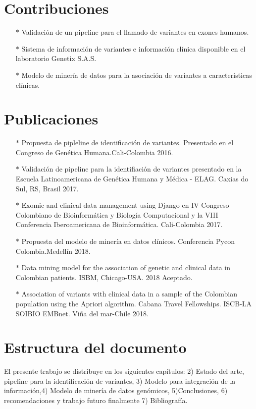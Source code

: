 \section*{Contribuciones}

\begin{itemize}
	\item[$*$] Validación de un pipeline para el llamado de variantes en exones humanos. 
	\item[$*$] Sistema de información de variantes e información clínica  disponible en el laboratorio Genetix S.A.S.
	\item[$*$] Modelo de minería de datos para la asociación de variantes a caracteristicas clínicas. 

\end{itemize}

\section*{Publicaciones}
\begin{itemize}
	\item[$*$] Propuesta de pipleline de identificación de variantes. Presentado en el Congreso de Genética Humana.Cali-Colombia 2016.
	\item[$*$] Validación de pipeline para la identifiación de variantes presentado en la Escuela Latinoamericana de Genética Humana y Médica - ELAG. Caxias do Sul, RS, Brasil 2017.
	\item[$*$] Exomic and clinical data management using Django en IV Congreso Colombiano de Bioinformática y Biología Computacional y la VIII Conferencia Iberoamericana de Bioinformática. Cali-Colombia 2017.
	\item[$*$] Propuesta del  modelo de minería en datos clínicos. Conferencia Pycon Colombia.Medellín 2018.
	\item[$*$] Data mining model for the association of genetic and clinical data in Colombian patients.  ISBM, Chicago-USA. 2018 Aceptado. 
	\item[$*$] Association of variants with clinical data in a sample of the Colombian population using the Apriori algorithm. Cabana Travel Fellowships. ISCB-LA SOIBIO EMBnet. Viña del mar-Chile 2018. 	
\end{itemize}
	

\section*{Estructura del documento}

El presente trabajo se distribuye en los siguientes capítulos: 2) Estado del arte, pipeline para la identificación de variantes, 3) Modelo para integración de la información,4) Modelo de minería de datos genómicos, 5)Conclusiones, 6) recomendaciones y trabajo futuro finalmente  7) Bibliografía.